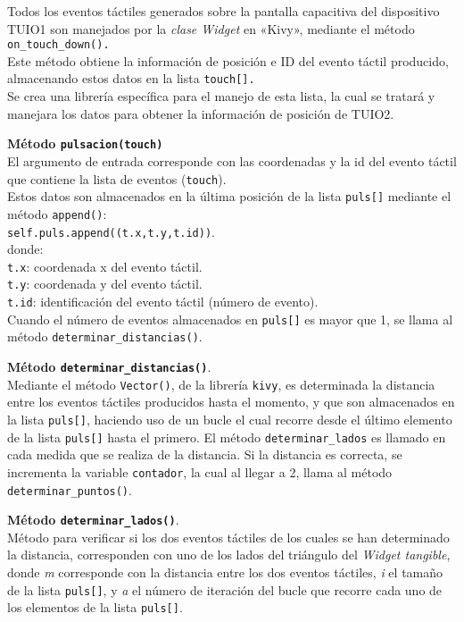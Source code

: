 Todos los eventos táctiles generados sobre la pantalla capacitiva del dispositivo TUIO1 son manejados por la \textit{clase Widget} en «Kivy», mediante el método \texttt{on\_touch\_down().}\\
Este método obtiene la información de posición e ID del evento táctil producido, almacenando estos datos en la lista \texttt{touch[].}\\
Se crea una librería específica para el manejo de esta lista, la cual se tratará y manejara los datos para obtener la información de posición de TUIO2.

\textbf{Método \texttt{pulsacion(touch)}}\\
El argumento de entrada corresponde con las coordenadas y la id del evento táctil que contiene la lista de eventos (\texttt{touch}).\\
Estos datos son almacenados en la última posición de la lista \texttt{puls[]} mediante el método \texttt{append()}:\\
\texttt{self.puls.append((t.x,t.y,t.id))}.\\
donde: \\
\texttt{t.x}: coordenada x del evento táctil.\\
\texttt{t.y}: coordenada y del evento táctil.\\
\texttt{t.id}: identificación del evento táctil (número de evento).\\
Cuando el número de eventos almacenados en \texttt{puls[]}   
es mayor que 1, se llama al método \texttt{determinar\_distancias()}.

\textbf{Método \texttt{determinar\_distancias()}}.\\
Mediante el método \texttt{Vector()}, de la librería \texttt{kivy}, es determinada la distancia entre los eventos táctiles producidos hasta el momento, y que son almacenados en la lista \texttt{puls[]}, haciendo uso de un bucle el cual recorre desde el último elemento de la lista \texttt{puls[]} hasta el primero. El método \texttt{determinar\_lados} es llamado en cada medida que se realiza de la distancia. Si la distancia es correcta, se incrementa la variable \texttt{contador}, la cual al llegar a 2, llama al método \texttt{determinar\_puntos()}.

\textbf{Método \texttt{determinar\_lados()}}.\\
Método para verificar si los dos eventos táctiles de los cuales se han determinado la distancia, corresponden con uno de los lados del triángulo del \textit{Widget tangible}, donde \textit{m} corresponde con la distancia entre los dos eventos táctiles, \textit{i} el tamaño de la lista \texttt{puls[]}, y \textit{a} el número de iteración del bucle que recorre cada uno de los elementos de la lista \texttt{puls[]}.

